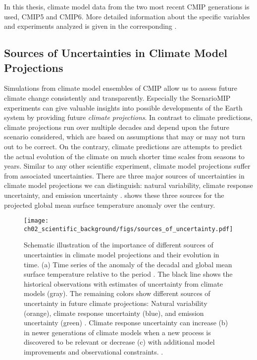 In this thesis, climate model data from the two most recent \ac{CMIP}
generations is used, \acs{CMIP}5 and \acs{CMIP}6. More detailed information
about the specific variables and experiments analyzed is given in the
corresponding .


\subsection{Sources of Uncertainties in Climate Model Projections}
\label{subsec:02:source_of_uncertainties}

Simulations from climate model ensembles of \ac{CMIP} allow us to assess future
climate change consistently and transparently. Especially the \ac{ScenarioMIP}
experiments can give valuable insights into possible developments of the Earth
system by providing future \emph{climate projections}. In contrast to climate
predictions, climate projections run over multiple decades and depend upon the
future scenario considered, which are based on assumptions that may or may not
turn out to be correct. On the contrary, climate predictions are attempts to
predict the actual evolution of the climate on much shorter time scales from
seasons to years. Similar to any other scientific experiment, climate model
projections suffer from associated uncertainties. There are three major sources
of uncertainties in climate model projections we can distinguish: natural
variability, climate response uncertainty, and emission uncertainty
\autocite{Hawkins2009, Hawkins2010}.  shows
these three sources for the projected global mean surface temperature anomaly
over the  century.

\begin{figure}[t]
  \centering
  \texttt{[image: 
    ch02\_scientific\_background/figs/sources\_of\_uncertainty.pdf]}
  \caption[
    Schematic illustration of the importance of different sources of
    uncertainties in climate model projections and their evolution in time.
  ]{
    Schematic illustration of the importance of different sources of
    uncertainties in climate model projections and their evolution in time. (a)
    Time series of the anomaly of the decadal and global mean surface
    temperature relative to the period . The black line shows
    the historical observations with estimates of uncertainty from climate
    models (gray). The remaining colors show different sources of uncertainty
    in future climate projections: Natural variability (orange), climate
    response uncertainty (blue), and emission uncertainty (green)
    \autocite{Hawkins2009, Hawkins2010}. Climate response uncertainty can
    increase (b) in newer generations of climate models when a new process is
    discovered to be relevant or decrease (c) with additional model
    improvements and observational constraints.
    .
  }
  \label{fig:02:sources_of_uncertainty}
\end{figure}

